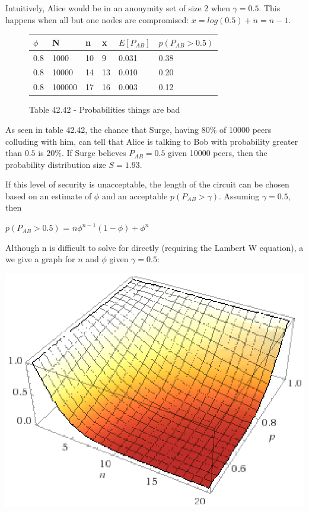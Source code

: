 \documentclass[twocolumn,11pt,english]{article}
\begin{document}
Intuitively, Alice would be in an anonymity set of size 2 when $\gamma = 0.5$. This happens when all but one nodes are compromised: $x = log( 0.5 ) + n = n - 1$. 

\begin{figure}[ht]
  \small
  \begin{tabular}{| l | l | l | l | l | l |}

    \hline
    $\phi$ & N & n & x & $E[P_{AB}]$ & $p(P_{AB} > 0.5)$ \\\hline
    0.8 & 1000 & 10 & 9 & 0.031 & 0.38\\
    0.8 & 10000 & 14 & 13 & 0.010 & 0.20\\
    0.8 & 100000 & 17 & 16 & 0.003 & 0.12\\
    \hline
  \end{tabular}
  \caption{Table 42.42 - Probabilities things are bad}
\end{figure}

As seen in table 42.42, the chance that Surge, having $80\%$ of 10000 peers colluding with him, can tell that Alice is talking to Bob with probability greater than $0.5$ is $20\%$. If Surge believes $P_{AB} = 0.5$ given 10000 peers, then the probability distribution size $S = 1.93$. 

If this level of security is unacceptable, the length of the circuit can be chosen based on an estimate of $\phi$ and an acceptable $p(P_{AB} > \gamma)$. Assuming $\gamma = 0.5$, then 
\begin{center}
$p(P_{AB} > 0.5)$ = $n\phi^{n-1} (1 - \phi ) + \phi^n $
\end{center}

Although n is difficult to solve for directly (requiring the Lambert W equation), a we give a graph for $n$ and $\phi$ given $\gamma = 0.5$:

\includegraphics*[width=\linewidth]{gamma5graph.eps}
\end{document}
